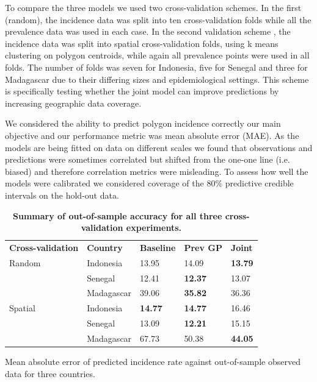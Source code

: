 \documentclass[10pt,letterpaper]{article}
\newlength\savedwidth
\newcommand\thickhline{\noalign{\global\savedwidth\arrayrulewidth\global\arrayrulewidth 2pt}%
\hline
\noalign{\global\arrayrulewidth\savedwidth}}
\begin{document}
To compare the three models we used two cross-validation schemes. 
In the first (random), the incidence data was split into ten cross-validation folds while all the prevalence data was used in each case.
In the second validation scheme , the incidence data was split into spatial cross-validation folds, using k means clustering on polygon centroids, while again all prevalence points were used in all folds.
The number of folds was seven for Indonesia, five for Senegal and three for Madagascar due to their differing sizes and epidemiological settings.
This scheme is specifically testing whether the joint model can improve predictions by increasing geographic data coverage.


We considered the ability to predict polygon incidence correctly our main objective and our performance metric was mean absolute error (MAE).
As the models are being fitted on data on different scales we found that observations and predictions were sometimes correlated but shifted from the one-one line (i.e. biased) and therefore correlation metrics were misleading.
To assess how well the models were calibrated we considered coverage of the 80\% predictive credible intervals on the hold-out data.




\begin{table}[!t]
\begin{adjustwidth}{-2.25in}{0in} %
\centering
\caption{
{\bf Summary of out-of-sample accuracy for all three cross-validation experiments.}}
\begin{tabular}{lllll}
\hline
{\bf Cross-validation} & {\bf Country}  & {\bf Baseline} & {\bf Prev GP} & {\bf Joint} \\
\thickhline 
Random & Indonesia  & 13.95 &  14.09 &  {\bf 13.79}\\
& Senegal  & 12.41 &  {\bf 12.37} &  13.07\\
& Madagascar  & 39.06 &  {\bf 35.82} &  36.36\vspace{3mm}\\
Spatial & Indonesia & {\bf 14.77} &  {\bf 14.77} &  16.46\\
& Senegal  & 13.09 &  {\bf 12.21} &  15.15\\
& Madagascar & 67.73 &  50.38 &  {\bf 44.05}\\
\end{tabular}
\begin{flushleft}
Mean absolute error of predicted incidence rate against out-of-sample observed data for three countries.
\end{flushleft}
\label{table1}
\end{adjustwidth}
\end{table}
\end{document}
